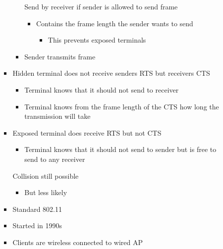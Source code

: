 \begin{itemize}
\begin{itemize}
\begin{itemize}
\begin{itemize}
                             Send by receiver if sender is allowed to send frame
                                \begin{itemize}
                                    \item Contains the frame length the sender wants to send
                                        \begin{itemize}
                                            \item This prevents exposed terminals
                                        \end{itemize}
                                \end{itemize}
                            \item Sender transmits frame
                        \end{itemize}
                    \item Hidden terminal does not receive senders RTS but receivers CTS
                        \begin{itemize}
                            \item Terminal knows that it should not send to receiver
                            \item Terminal knows from the frame length of the CTS how long the transmission will take
                        \end{itemize}
                    \item Exposed terminal does receive RTS but not CTS
                        \begin{itemize}
                            \item Terminal knows that it should not send to sender but is free to send to any receiver
                        \end{itemize}
                    \icon Collision still possible
                        \begin{itemize}
                            \item But less likely
                        \end{itemize}
                \end{itemize}
                \begin{itemize}
                    \item Standard 802.11
                    \item Started in 1990s
                    \item Clients are wireless connected to wired AP

\end{itemize}
\end{itemize}
\end{itemize}
